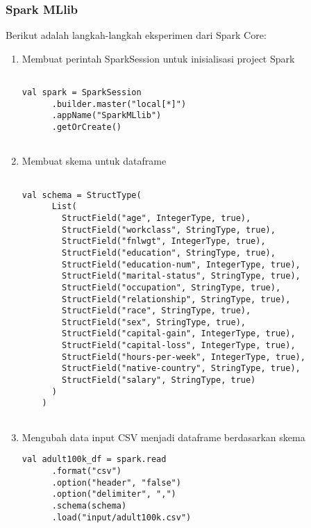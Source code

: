 \subsubsection{Spark MLlib}
\noindent Berikut adalah langkah-langkah eksperimen dari Spark Core:
\begin{enumerate}

\item Membuat perintah SparkSession untuk inisialisasi project Spark
\begin{lstlisting}[basicstyle=\ttfamily, frame=single,
	columns=fullflexible, keepspaces=true, breaklines=true, label=ls_kepatuhan_1_1_1_logo_sharif_judge, caption=Main method]
	
val spark = SparkSession
      .builder.master("local[*]")
      .appName("SparkMLlib")
      .getOrCreate()
	
\end{lstlisting}

\item Membuat skema untuk dataframe 
\begin{lstlisting}[basicstyle=\ttfamily, frame=single,
	columns=fullflexible, keepspaces=true, breaklines=true, label=ls_kepatuhan_1_1_1_logo_sharif_judge, caption=Main method]
	
val schema = StructType(
      List(
        StructField("age", IntegerType, true),
        StructField("workclass", StringType, true),
        StructField("fnlwgt", IntegerType, true),
        StructField("education", StringType, true),
        StructField("education-num", IntegerType, true),
        StructField("marital-status", StringType, true),
        StructField("occupation", StringType, true),
        StructField("relationship", StringType, true),
        StructField("race", StringType, true),
        StructField("sex", StringType, true),
        StructField("capital-gain", IntegerType, true),
        StructField("capital-loss", IntegerType, true),
        StructField("hours-per-week", IntegerType, true),
        StructField("native-country", StringType, true),
        StructField("salary", StringType, true)
      )
    )
    	
\end{lstlisting}

\item Mengubah data input CSV menjadi dataframe berdasarkan skema
\begin{lstlisting}[basicstyle=\ttfamily, frame=single,
	columns=fullflexible, keepspaces=true, breaklines=true, label=ls_kepatuhan_1_1_1_logo_sharif_judge, caption=Main method]
val adult100k_df = spark.read
      .format("csv")
      .option("header", "false")
      .option("delimiter", ",")
      .schema(schema)
      .load("input/adult100k.csv")


\end{lstlisting}
\end{enumerate}
